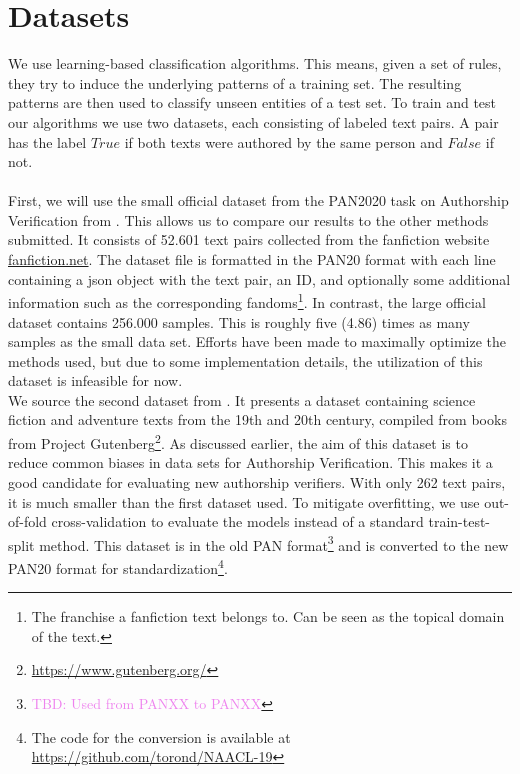 \section{Datasets}
We use learning-based classification algorithms.
This means, given a set of rules, they try to induce the underlying patterns of a training set.
The resulting patterns are then used to classify unseen entities of a test set.
To train and test our algorithms we use two datasets, each consisting of labeled text pairs.
A pair has the label $True$ if both texts were authored by the same person and $False$ if not.\\\\
First, we will use the small official dataset from the PAN2020 task on Authorship Verification from \cite{bevendorff2020overview}.
This allows us to compare our results to the other methods submitted.
It consists of 52.601 text pairs collected from the fanfiction website \url{fanfiction.net}.
The dataset file is formatted in the PAN20 format with each line containing a json object with the text pair, an ID, and optionally some additional information such as the corresponding fandoms\footnote{The franchise a fanfiction text belongs to. Can be seen as the topical domain of the text.}.
In contrast, the large official dataset contains 256.000 samples.
This is roughly five (4.86) times as many samples as the small data set.
Efforts have been made to maximally optimize the methods used, but due to some implementation details, the utilization of this dataset is infeasible for now.\\
We source the second dataset from \cite{stein2019unbiasedGutenbergCorpus}.
It presents a dataset containing science fiction and adventure texts from the 19th and 20th century, compiled from books from Project Gutenberg\footnote{\url{https://www.gutenberg.org/}}.
As discussed earlier, the aim of this dataset is to reduce common biases in data sets for Authorship Verification.
This makes it a good candidate for evaluating new authorship verifiers.
With only 262 text pairs, it is much smaller than the first dataset used.
To mitigate overfitting, we use out-of-fold cross-validation to evaluate the models instead of a standard train-test-split method.
This dataset is in the old PAN format\footnote{\textcolor{violet}{TBD: Used from PANXX to PANXX}} and is converted to the new PAN20 format for standardization\footnote{The code for the conversion is available at \url{https://github.com/torond/NAACL-19}}.\\

